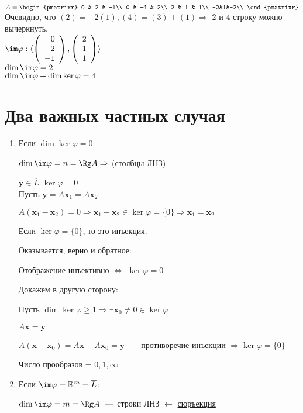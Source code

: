 $A = \begin{pmatrixr}
0 & 2 & -1\\
0 & -4 & 2\\
2 & 1 & 1\\
-2&1&-2\\ \end{pmatrixr}$ \\
Очевидно, что $(2) = -2(1), (4) = (3)+(1) \Rightarrow$ 2 и 4 строку можно вычеркнуть. \\
$\im\varphi :\langle \left( \begin{array}{r}
    0\\
    2\\
    -1
\end{array}\right), \left( \begin{array}{r}
    2\\
    1\\
    1
\end{array}\right) \rangle$\\
$\dim \im\varphi = 2$\\
$\dim \im \varphi +\dim \ker \varphi =4$




\section{Два важных частных случая}

\begin{enumerate}
    \item Если \underline{$\dim\ker\varphi=0$}:
    
    $\dim \im \varphi = n = \Rg A \Rightarrow$ (столбцы ЛНЗ)
    
    $\textbf{y} \in \overline{L}$
    $\ker\varphi = {0}$\\
    Пусть $\textbf{y}=A\textbf{x$_1$}=A\textbf{x$_2$}$
    
    $A(\textbf{x$_1$}-\textbf{x$_2$}) = 0 \Rightarrow \textbf{x$_1$} - \textbf{x$_2$} \in \ker\varphi =\{0\} \Rightarrow \textbf{x$_1$}=\textbf{x$_2$}$
    
    Если $\ker\varphi = \{0\}$, то это \underline{инъекция}.
    
    Оказывается, верно и обратное:
    
    Отображение инъективно $\Leftrightarrow$ $\ker\varphi = {0}$
    
    Докажем в другую сторону:
    
    Пусть $\dim\ker \varphi \geq 1  \Rightarrow \exists \textbf{x$_0$} \neq 0 \in \ker \varphi$
    
    $A\textbf{x}=\textbf{y}$
    
$A(\textbf{x}+\textbf{x$_0$}) = A\textbf{x}+A\textbf{x$_0$} = \textbf{y}$~---~противоречие инъекции $\Rightarrow \ker\varphi = \{0\}$

Число прообразов = $0, 1, \infty$
  \item Если \underline{$\im\varphi = \mathbb{R}^m = \overline{L}$}:
  
  $\dim \im\varphi = m = \Rg A$~---~строки ЛНЗ $\leftarrow$ \underline{сюръекция}
\end{enumerate}
